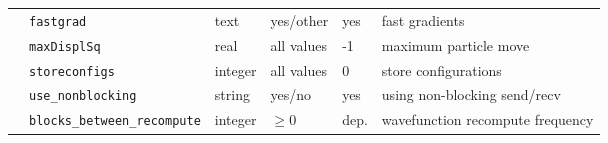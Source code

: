 \begin{table}[h]
\begin{center}
\begin{tabularx}{\textwidth}{l l l l l l }
   &   \texttt{fastgrad            } &  text  & yes/other & yes   & fast gradients  \\
   &   \texttt{maxDisplSq      } &  real  & all values & -1   & maximum particle move  \\
   &   \texttt{storeconfigs        } &  integer  & all values & 0   & store configurations  \\
   &   \texttt{use\_nonblocking    } &  string  & yes/no & yes   & using non-blocking send/recv \\
   &   \texttt{blocks\_between\_recompute} &  integer  & $\ge 0$ & dep.  & wavefunction recompute frequency  \\
  \hline
\end{tabularx}
\end{center}
\end{table}

